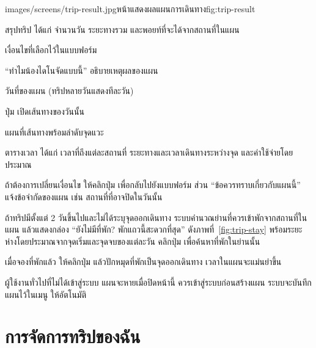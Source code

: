 \begin{screenshot}{images/screens/trip-result.jpg}{หน้าแสดงผลแผนการเดินทาง}{fig:trip-result}
\end{screenshot}

\begin{calloutlist}
  \item สรุปทริป ได้แก่ จำนวนวัน ระยะทางรวม และพอยท์ที่จะได้จากสถานที่ในแผน
  \item เงื่อนไขที่เลือกไว้ในแบบฟอร์ม
  \item ``ทำไมน้องไดโนจัดแบบนี้'' อธิบายเหตุผลของแผน
  \item วันที่ของแผน (ทริปหลายวันแสดงทีละวัน)
  \item ปุ่ม  เปิดเส้นทางของวันนั้น
  \item แผนที่เส้นทางพร้อมลำดับจุดแวะ
  \item ตารางเวลา ได้แก่ เวลาที่ถึงแต่ละสถานที่ ระยะทางและเวลาเดินทางระหว่างจุด และค่าใช้จ่ายโดยประมาณ
\end{calloutlist}

ถ้าต้องการเปลี่ยนเงื่อนไข ให้คลิกปุ่ม  เพื่อกลับไปยังแบบฟอร์ม ส่วน ``ข้อควรทราบเกี่ยวกับแผนนี้'' แจ้งข้อจำกัดของแผน เช่น สถานที่ที่อาจปิดในวันนั้น

ถ้าทริปมีตั้งแต่ 2 วันขึ้นไปและไม่ได้ระบุจุดออกเดินทาง ระบบคำนวณย่านที่ควรเข้าพักจากสถานที่ในแผน แล้วแสดงกล่อง ``ยังไม่มีที่พัก? พักแถวนี้สะดวกที่สุด'' ดังภาพที่~\ref{fig:trip-stay} พร้อมระยะห่างโดยประมาณจากจุดเริ่มและจุดจบของแต่ละวัน คลิกปุ่ม  เพื่อค้นหาที่พักในย่านนั้น


เมื่อจองที่พักแล้ว ให้คลิกปุ่ม  แล้วปักหมุดที่พักเป็นจุดออกเดินทาง เวลาในแผนจะแม่นยำขึ้น

\begin{warning}
ผู้ใช้งานทั่วไปที่ไม่ได้เข้าสู่ระบบ แผนจะหายเมื่อปิดหน้านี้ ควรเข้าสู่ระบบก่อนสร้างแผน ระบบจะบันทึกแผนไว้ในเมนู  ให้อัตโนมัติ
\end{warning}

\section{การจัดการทริปของฉัน}
\label{sec:my-trips}

